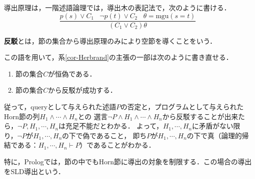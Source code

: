 \documentclass[uplatex, 12pt, dvipdfmx]{jsreport}
\begin{document}
\begin{definition}[導出：一階述語論理]
    導出原理は，一階述語論理では，導出木の表記法で，次のように書ける．
    \[ \frac{p(s)\lor C_1\;\;\;\lnot p(t)\lor C_2\;\;\;\theta=\mathrm{mgu}(s=t)}{(C_1\lor C_2)\theta} \]
\end{definition}

\begin{definition}[refutation]
    \textbf{反駁}とは，節の集合から導出原理のみにより空節を導くことをいう．
\end{definition}
\begin{remark}
    この語を用いて，系\ref{cor-Herbrand}の主張の一部は次のように書き直せる．
    \begin{enumerate}
        \item 節の集合$C$が恒偽である．
        \item 節の集合$C$から反駁が成功する．
    \end{enumerate}
    従って，queryとして与えられた述語$P$の否定と，プログラムとして与えられたHorn節の列$H_1\land\cdots\land H_n$との
    選言$\lnot P\land H_1\land\cdots\land H_n$から反駁することが出来たら，$\lnot P,H_1,\cdots,H_n$は充足不能だとわかる．
    よって，$H_1,\cdots,H_n$に矛盾がない限り，$\lnot P$が$H_1,\cdots,H_n$の下で偽であること，
    即ち$P$が$H_1,\cdots,H_n$の下で真（論理的帰結である：$H_1,\cdots,H_n\vdash P$）であることがわかる．
\end{remark}

特に，Prologでは，節の中でもHorn節に導出の対象を制限する．この場合の導出をSLD導出という．
\end{document}
